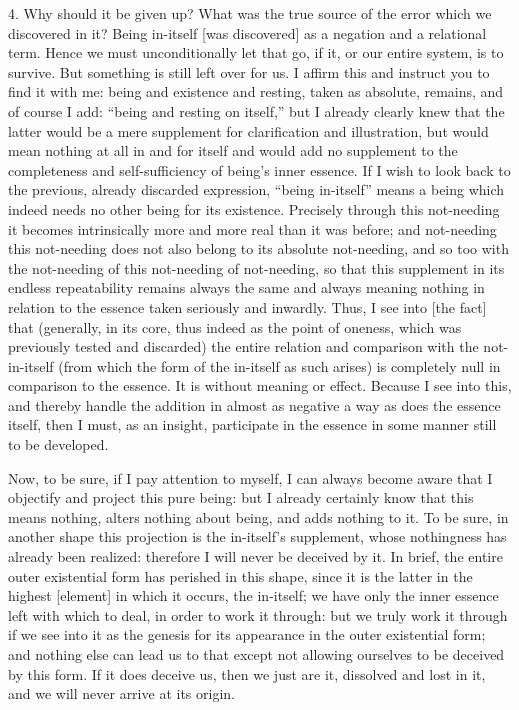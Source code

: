 4. Why should it be given up?
What was the true source of the error
which we discovered in it?
Being in-itself [was discovered] as
a negation and a relational term.
Hence we must unconditionally let that go,
if it, or our entire system, is to survive.
But something is still left over for us.
I affirm this and instruct you to find it with me:
being and existence and resting,
taken as absolute, remains,
and of course I add:
“being and resting on itself,”
but I already clearly knew that
the latter would be a mere supplement
for clarification and illustration,
but would mean nothing at all
in and for itself
and would add no supplement to the
completeness and self-sufficiency of
being’s inner essence.
If I wish to look back to the previous,
already discarded expression,
“being in-itself” means a being
which indeed needs no other being for its existence.
Precisely through this not-needing
it becomes intrinsically more and more
real than it was before;
and not-needing this not-needing does not also
belong to its absolute not-needing,
and so too with the not-needing of
this not-needing of not-needing,
so that this supplement in its
endless repeatability remains always the same
and always meaning nothing in relation to
the essence taken seriously and inwardly.
Thus, I see into [the fact] that
(generally, in its core,
thus indeed as the point of oneness,
which was previously tested and discarded)
the entire relation and comparison
with the not-in-itself
(from which the form of the in-itself as such arises)
is completely null in comparison to the essence.
It is without meaning or effect.
Because I see into this,
and thereby handle the addition
in almost as negative a way
as does the essence itself,
then I must, as an insight,
participate in the essence
in some manner still to be developed.

Now, to be sure, if I pay attention to myself,
I can always become aware that I objectify
and project this pure being:
but I already certainly know
that this means nothing,
alters nothing about being,
and adds nothing to it.
To be sure, in another shape
this projection is the in-itself’s supplement,
whose nothingness has already been realized:
therefore I will never be deceived by it.
In brief, the entire outer existential form
has perished in this shape,
since it is the latter in the highest [element]
in which it occurs, the in-itself;
we have only the inner essence left with which to deal,
in order to work it through:
but we truly work it through
if we see into it as the genesis
for its appearance in the outer existential form;
and nothing else can lead us to that except
not allowing ourselves to be deceived by this form.
If it does deceive us, then we just are it,
dissolved and lost in it,
and we will never arrive at its origin.

